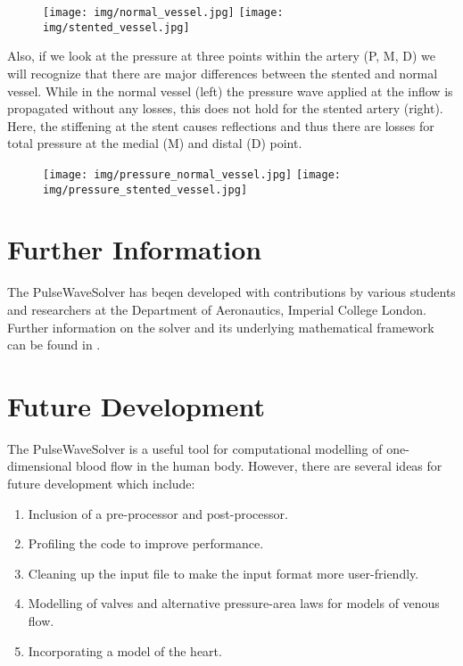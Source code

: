 \begin{figure}
	\texttt{[image: img/normal\_vessel.jpg]}
	\texttt{[image: img/stented\_vessel.jpg]}
	\caption{}
	\label{f:pulsewave:stented:vessels}
\end{figure}

Also, if we look at the pressure at three points within the artery (P, M, D) we
will recognize that there are major differences between the stented and normal
vessel. While in the normal vessel (left) the pressure wave applied at the
inflow is propagated without any losses, this does not hold for the stented
artery (right). Here, the stiffening at the stent causes reflections and thus
there are losses for total pressure at the medial (M) and distal (D) point.

\begin{figure}
	\texttt{[image: img/pressure\_normal\_vessel.jpg]}
	\texttt{[image: img/pressure\_stented\_vessel.jpg]}
\end{figure}

\section{Further Information}
The PulseWaveSolver has beqen developed with contributions by various students
and researchers at the Department of Aeronautics, Imperial College London. 
Further information on the solver and its underlying mathematical framework 
can be found in \cite{Ro12,Pi12}.

\section{Future Development}
The PulseWaveSolver is a useful tool for computational modelling of
one-dimensional blood flow in the human body. However, there are several ideas
for future development which include:
\begin{enumerate}
\item Inclusion of a pre-processor and post-processor.
\item Profiling the code to improve performance.
\item Cleaning up the input file to make the input format more user-friendly.
\item Modelling of valves and alternative pressure-area laws for models of
venous flow.
\item Incorporating a model of the heart.
\end{enumerate}

